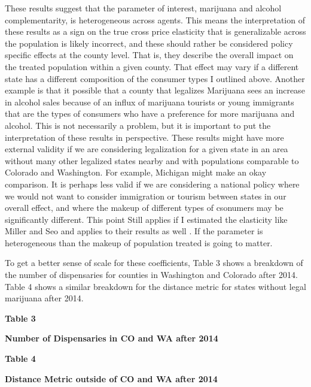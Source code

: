 \documentclass[11pt]{article}
\begin{document}
These results suggest that the parameter of interest, marijuana and alcohol complementarity, is heterogeneous across agents. This means the interpretation of these results as a sign on the true cross price elasticity that is generalizable across the population is likely incorrect, and these should rather be considered policy specific effects at the county level. That is, they describe the overall impact on the treated population within a given county. That effect may vary if a different state has a different composition of the consumer types I outlined above. Another example is that it possible that a county that legalizes Marijuana sees an increase in alcohol sales because of an influx of marijuana tourists or young immigrants that are the types of consumers who have a preference for more marijuana and alcohol. This is not necessarily a problem, but it is important to put the interpretation of these results in perspective. These results might have more external validity if we are considering legalization for a given state in an area without many other legalized states nearby and with populations comparable to Colorado and Washington. For example, Michigan might make an okay comparison. It is perhaps less valid if we are considering a national policy where we would not want to consider immigration or tourism between states in our overall effect, and where the makeup of different types of csonumers may be significantly different. This point Still applies if I estimated the elasticity like Miller and Seo and applies to their results as well \cite{miller_seo_2018}. If the parameter is heterogeneous than the makeup of population treated is going to matter.

To get a better sense of scale for these coefficients, Table 3 shows a breakdown of the number of dispensaries for counties in Washington and Colorado after 2014. Table 4 shows a similar breakdown for the distance metric for states without legal marijuana after 2014. 

\begin{center}
	
	\centering
	\LARGE{\textbf{Table 3}}\par\medskip
	
	\normalsize{\textbf{Number of Dispensaries in CO and WA after 2014}}\par\medskip
	\scalebox{.8}{
		
	}
\end{center}

\begin{center}
	
	\centering
	\LARGE{\textbf{Table 4}}\par\medskip
	
	\normalsize{\textbf{Distance Metric outside of CO and WA after 2014}}\par\medskip
	\scalebox{.8}{
		
	}
\end{center}
\end{document}
